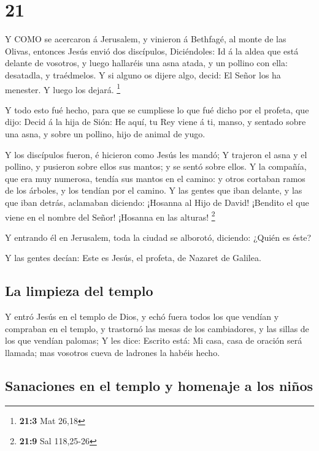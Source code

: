 \hypertarget{section-20}{%
\section{21}\label{section-20}}

 Y COMO se acercaron á Jerusalem, y vinieron á Bethfagé, al
monte de las Olivas, entonces Jesús envió dos discípulos, 
Diciéndoles: Id á la aldea que está delante de vosotros, y luego
hallaréis una asna atada, y un pollino con ella: desatadla, y
traédmelos.  Y si alguno os dijere algo, decid: El Señor los
ha menester. Y luego los dejará. \footnote{\textbf{21:3} Mat 26,18}

 Y todo esto fué hecho, para que se cumpliese lo que fué
dicho por el profeta, que dijo:  Decid á la hija de Sión: He
aquí, tu Rey viene á ti, manso, y sentado sobre una asna, y sobre un
pollino, hijo de animal de yugo.

 Y los discípulos fueron, é hicieron como Jesús les mandó;
 Y trajeron el asna y el pollino, y pusieron sobre ellos sus
mantos; y se sentó sobre ellos.  Y la compañía, que era muy
numerosa, tendía sus mantos en el camino: y otros cortaban ramos de los
árboles, y los tendían por el camino.  Y las gentes que iban
delante, y las que iban detrás, aclamaban diciendo: ¡Hosanna al Hijo de
David! ¡Bendito el que viene en el nombre del Señor! ¡Hosanna en las
alturas! \footnote{\textbf{21:9} Sal 118,25-26}

 Y entrando él en Jerusalem, toda la ciudad se alborotó,
diciendo: ¿Quién es éste?

 Y las gentes decían: Este es Jesús, el profeta, de Nazaret
de Galilea.

\hypertarget{la-limpieza-del-templo}{%
\subsection{La limpieza del templo}\label{la-limpieza-del-templo}}

 Y entró Jesús en el templo de Dios, y echó fuera todos los
que vendían y compraban en el templo, y trastornó las mesas de los
cambiadores, y las sillas de los que vendían palomas;  Y
les dice: Escrito está: Mi casa, casa de oración será llamada; mas
vosotros cueva de ladrones la habéis hecho.

\hypertarget{sanaciones-en-el-templo-y-homenaje-a-los-niuxf1os}{%
\subsection{Sanaciones en el templo y homenaje a los
niños}\label{sanaciones-en-el-templo-y-homenaje-a-los-niuxf1os}}

